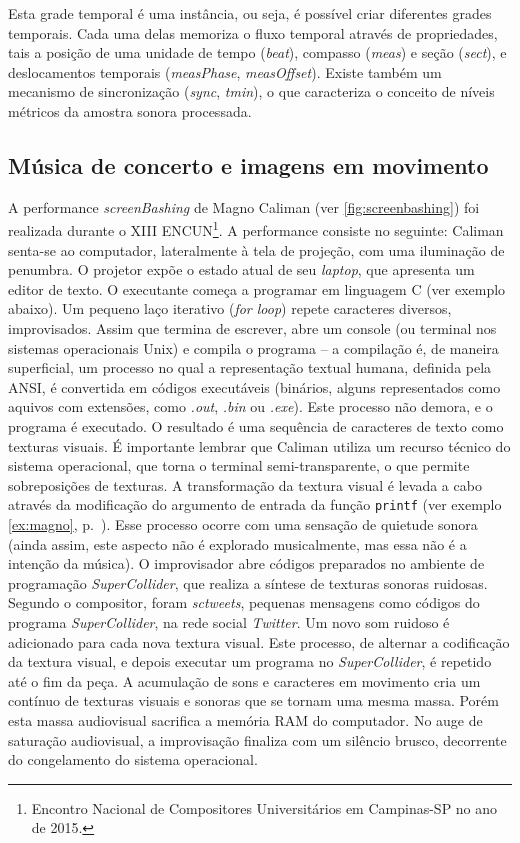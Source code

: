 Esta grade temporal é uma instância, ou seja, é possível criar diferentes grades temporais. Cada uma delas memoriza o fluxo temporal através de propriedades, tais a posição de uma unidade de tempo (\emph{beat}), compasso (\emph{meas}) e seção (\emph{sect}), e deslocamentos temporais (\emph{measPhase}, \emph{measOffset}). Existe também um mecanismo de sincronização (\emph{sync}, \emph{tmin}), o que caracteriza o conceito de níveis métricos da amostra sonora processada. 

\subsection{Música de concerto e imagens em movimento}\label{sec:concerto}

A performance \emph{screenBashing} de Magno Caliman (ver \autoref{fig:screenbashing}) foi realizada durante o XIII ENCUN\footnote{Encontro Nacional de Compositores Universitários em Campinas-SP no ano de 2015.}. A performance consiste no seguinte: Caliman senta-se ao computador, lateralmente à tela de projeção, com uma iluminação de penumbra. O projetor expõe o estado atual de seu \emph{laptop}, que apresenta um editor de texto. O executante começa a programar em linguagem C (ver exemplo abaixo). Um pequeno laço iterativo (\emph{for loop}) repete caracteres diversos, improvisados. Assim que termina de escrever, abre um console (ou terminal nos sistemas operacionais Unix) e compila o programa -- a compilação é, de maneira superficial, um processo no qual a representação textual humana, definida pela ANSI, é convertida em códigos executáveis (binários, alguns representados como aquivos com extensões, como \emph{.out}, \emph{.bin} ou \emph{.exe}). Este processo não demora, e o programa é executado. O resultado é uma sequência de caracteres de texto como texturas visuais. É importante lembrar que Caliman utiliza um recurso técnico do sistema operacional, que torna o terminal semi-transparente, o que permite sobreposições de texturas. A transformação da textura visual é levada a cabo através da modificação do argumento de entrada da função \verb|printf| (ver exemplo \ref{ex:magno}, p.~\pageref{ex:magno}). Esse processo ocorre com uma sensação de quietude sonora (ainda assim, este aspecto não é explorado musicalmente, mas essa não é a intenção da música). O improvisador abre códigos preparados no ambiente de programação  \emph{SuperCollider}, que realiza a síntese de texturas sonoras ruidosas. Segundo o compositor, foram \emph{sctweets}, pequenas mensagens como códigos do programa \emph{SuperCollider}, na rede social \emph{Twitter}. Um novo som ruidoso é adicionado para cada nova textura visual. Este processo, de alternar a codificação da textura visual, e depois executar um programa no \emph{SuperCollider}, é repetido até o fim da peça. A acumulação de sons e caracteres em movimento cria um contínuo de texturas visuais e sonoras que se tornam uma mesma massa. Porém esta massa audiovisual sacrifica a memória RAM do computador. No auge de saturação audiovisual, a improvisação finaliza com um silêncio brusco, decorrente do congelamento do sistema operacional.


